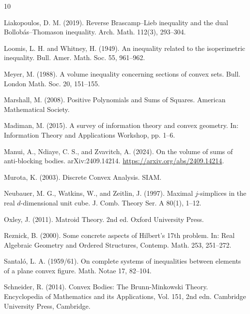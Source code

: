 \documentclass[11pt]{amsart}
\theoremstyle{definition}
\theoremstyle{remark}
\begin{document}
\begin{thebibliography}{10}


 Liakopoulos, D. M. (2019). Reverse Brascamp–Lieb inequality and the dual Bollobás–Thomason inequality. Arch. Math. 112(3), 293–304.

 Loomis, L. H. and Whitney, H. (1949). An inequality related to the isoperimetric inequality. Bull. Amer. Math. Soc. 55, 961–962.

 Meyer, M. (1988). A volume inequality concerning sections of convex sets. Bull. London Math. Soc. 20, 151–155.

 Marshall, M. (2008). Positive Polynomials and Sums of Squares. American Mathematical Society.

 Madiman, M. (2015). A survey of information theory and convex geometry. In: Information Theory and Applications Workshop, pp. 1–6.

 Manui, A., Ndiaye, C. S., and Zvavitch, A. (2024). On the volume of sums of anti-blocking bodies. arXiv:2409.14214. \url{https://arxiv.org/abs/2409.14214}.


 Murota, K. (2003). Discrete Convex Analysis. SIAM.

 Neubauer, M. G., Watkins, W., and Zeitlin, J. (1997). Maximal \(j\)-simplices in the real \(d\)-dimensional unit cube. J. Comb. Theory Ser. A 80(1), 1–12.

 Oxley, J. (2011). Matroid Theory. 2nd ed. Oxford University Press.

 Reznick, B. (2000). Some concrete aspects of Hilbert's 17th problem. In: Real Algebraic Geometry and Ordered Structures, Contemp. Math. 253, 251–272.

 Santaló, L. A. (1959/61). On complete systems of inequalities between elements of a plane convex figure. Math. Notae 17, 82–104.

 Schneider, R. (2014). Convex Bodies: The Brunn-Minkowski Theory. Encyclopedia of Mathematics and its Applications, Vol. 151, 2nd edn. Cambridge University Press, Cambridge.


\end{thebibliography}
\end{document}
